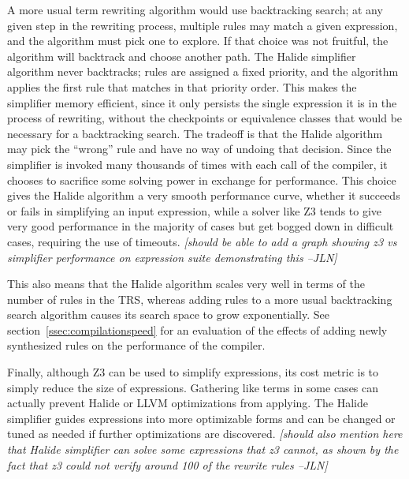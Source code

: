 \documentclass[sigplan,10pt,review,anonymous]{acmart}\settopmatter{printfolios=true,printccs=false,printacmref=false}
\newcommand{\jln}[1]{\textcolor{uwpurple}{\textit{[{#1} --JLN]}}}
\begin{document}
A more usual term rewriting algorithm would use backtracking search; at any given step in the rewriting process, multiple rules may match a given expression, and the algorithm must pick one to explore. If that choice was not fruitful, the algorithm will backtrack and choose another path. The Halide simplifier algorithm never backtracks; rules are assigned a fixed priority, and the algorithm applies the first rule that matches in that priority order. This makes the simplifier memory efficient, since it only persists the single expression it is in the process of rewriting, without the checkpoints or equivalence classes that would be necessary for a backtracking search. The tradeoff is that the Halide algorithm may pick the ``wrong'' rule and have no way of undoing that decision. Since the simplifier is invoked many thousands of times with each call of the compiler, it chooses to sacrifice some solving power in exchange for performance. This choice gives the Halide algorithm a very smooth performance curve, whether it succeeds or fails in simplifying an input expression, while a solver like Z3 tends to give very good performance in the majority of cases but get bogged down in difficult cases, requiring the use of timeouts. \jln{should be able to add a graph showing z3 vs simplifier performance on expression suite demonstrating this}

This also means that the Halide algorithm scales very well in terms of the number of rules in the TRS, whereas adding rules to a more usual backtracking search algorithm causes its search space to grow exponentially. See section~\ref{ssec:compilationspeed} for an evaluation of the effects of adding newly synthesized rules on the performance of the compiler. 

Finally, although Z3 can be used to simplify expressions, its cost metric is to simply reduce the size of expressions. Gathering like terms in some cases can actually prevent Halide or LLVM optimizations from applying. The Halide simplifier guides expressions into more optimizable forms and can be changed or tuned as needed if further optimizations are discovered. \jln{should also mention here that Halide simplifier can solve some expressions that z3 cannot, as shown by the fact that z3 could not verify around 100 of the rewrite rules}

\end{document}
